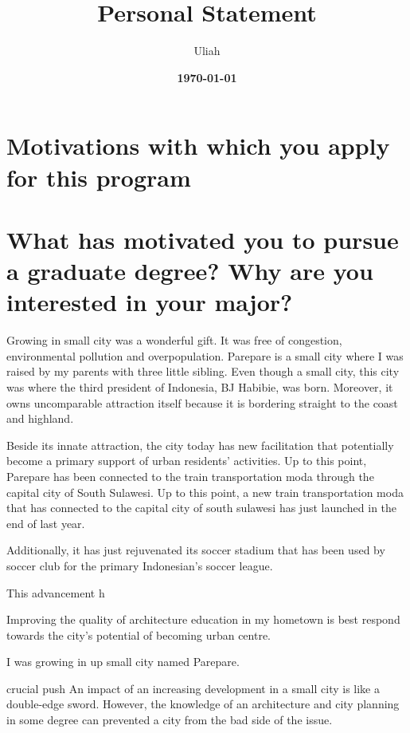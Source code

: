 \documentclass[11pt]{simart} %
\title{
\textbf{Personal Statement} \\
} %
\date{\textbf{\today}}
\author{Uliah}
\begin{document}
\maketitle %

\section{Motivations with which you apply for this program}
\section*{What has motivated you to pursue a graduate degree? Why are you interested in your major?}

Growing in small city was a wonderful gift. It was free of congestion, environmental pollution and overpopulation. Parepare is a small city where I was raised by my parents with three little sibling. Even though a small city, this city was where the third president of Indonesia, BJ Habibie, was born.
Moreover, it owns uncomparable attraction itself because it is bordering straight to the coast and highland.

Beside its innate attraction, the city today has new facilitation that potentially become a primary support of urban residents' activities.
Up to this point, Parepare has been connected to the train transportation moda through the capital city of South Sulawesi.
Up to this point, a new train transportation moda that has connected to the capital city of south sulawesi has just launched in the end of last year.

Additionally, it has just rejuvenated its soccer stadium that has been used by soccer club for the primary Indonesian's soccer league.

This advancement h


Improving the quality of architecture education in my hometown is best respond towards the city's potential of becoming urban centre.

I was growing in up small city named Parepare.

crucial
push
An impact of an increasing development in a small city is like a double-edge sword.
However, the knowledge of an architecture and city planning in some degree can prevented a city from the bad side of the issue.
\end{document}
